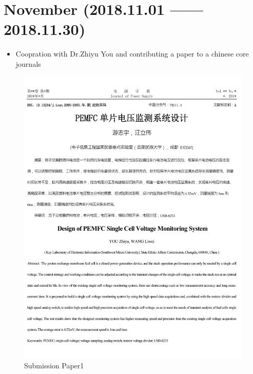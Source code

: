 \documentclass[12pt]{article}
\begin{document}
\section{November  \small{(2018.11.01 —— 2018.11.30)} }
\begin{itemize}
    \item Coopration with Dr.Zhiyu You and contributing a paper to a chinese core journals
\end{itemize}  
\par \vspace{-0.4cm}
\begin{figure}[h!]
\centering
\includegraphics[scale=0.5, angle=0]{P1th.pdf}
\caption{Submission Paper1}
\label{fig:Submission Paper:PEMFC}
\end{figure}
\end{document}
